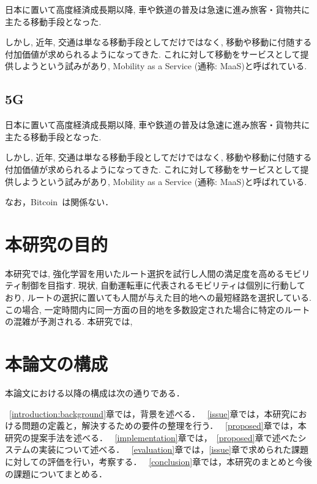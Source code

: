 日本に置いて高度経済成長期以降, 車や鉄道の普及は急速に進み旅客・貨物共に主たる移動手段となった.

しかし, 近年, 交通は単なる移動手段としてだけではなく, 移動や移動に付随する付加価値が求められるようになってきた.
これに対して移動をサービスとして提供しようという試みがあり, Mobility as a Service (通称: MaaS)と呼ばれている.


\subsection{5G}

日本に置いて高度経済成長期以降, 車や鉄道の普及は急速に進み旅客・貨物共に主たる移動手段となった.

しかし, 近年, 交通は単なる移動手段としてだけではなく, 移動や移動に付随する付加価値が求められるようになってきた.
これに対して移動をサービスとして提供しようという試みがあり, Mobility as a Service (通称: MaaS)と呼ばれている.






なお，Bitcoin~\cite{Bitcoin}は関係ない．



\section{本研究の目的}

本研究では, 強化学習を用いたルート選択を試行し人間の満足度を高めるモビリティ制御を目指す.
現状, 自動運転車に代表されるモビリティは個別に行動しており, ルートの選択に置いても人間が与えた目的地への最短経路を選択している.
この場合, 一定時間内に同一方面の目的地を多数設定された場合に特定のルートの混雑が予測される.
本研究では, 



\section{本論文の構成}

本論文における以降の構成は次の通りである．

~\ref{introduction:background}章では，背景を述べる．
~\ref{issue}章では，本研究における問題の定義と，解決するための要件の整理を行う．
~\ref{proposed}章では，本研究の提案手法を述べる．
~\ref{implementation}章では，~\ref{proposed}章で述べたシステムの実装について述べる．
~\ref{evaluation}章では，\ref{issue}章で求められた課題に対しての評価を行い，考察する．
~\ref{conclusion}章では，本研究のまとめと今後の課題についてまとめる．


